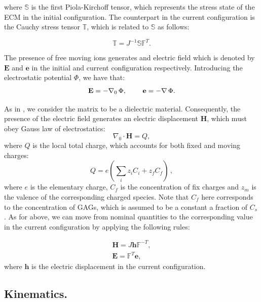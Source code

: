 \documentclass[runningheads]{llncs}
\newcommand{\F}{\ensuremath{\mathbb{F}}}
\begin{document}
where $\mathbb{S}$ is the first Piola-Kirchoff tensor, which represents the stress state of the ECM in the initial configuration. The counterpart in the current configuration is the Cauchy stress tensor $\mathbb{T}$, which is related to $\mathbb{S}$ as follows:

\begin{equation}
\mathbb{T} = J^{-1}\mathbb{S}\F^T.
\end{equation}

The presence of free moving ions generates and electric field which is denoted by $\mathbf{E}$ and $\mathbf{e}$ in the initial and current configuration respectively. Introducing the electrostatic potential $\Phi$, we have that:
\begin{equation}
\mathbf{E}= -\nabla_0 \, \Phi, \hspace{8mm} \mathbf{e}= - \nabla \, \Phi.
\end{equation}

As in \cite{Reviewpolyel}, we consider the matrix to be a dielectric material. Consequently, the presence of the electric field generates an electric displacement $\mathbf{H}$, which must obey Gauss law of electrostatics:
\begin{equation}
\nabla_0 \cdot \mathbf{H}= Q,
\label{gauss}
\end{equation}
where $Q$ is the local total charge, which accounts for both fixed and moving charges:
\begin{equation}
Q = e\left(\sum\limits_{i} z_i C_i+z_f C_{f}\right)\, , 
\end{equation}
where $e$ is the elementary charge, $C_f$ is the concentration of fix charges and $z_m$ is the valence of the corresponding charged species. Note that $C_f$ here corresponds to the concentration of GAGs, which is assumed to be a constant a fraction of $C_s$. As for above, we can move from nominal quantities to the corresponding value in the current configuration by applying the following rules:

\begin{eqnarray}
\mathbf{H} = J \mathbf{h}\F^{-T},\\
\mathbf{E} = \F^T \mathbf{e},
\end{eqnarray}
where $\mathbf{h}$ is the electric displacement in the current configuration.
\newpage

\subsection{Kinematics.}
\end{document}
